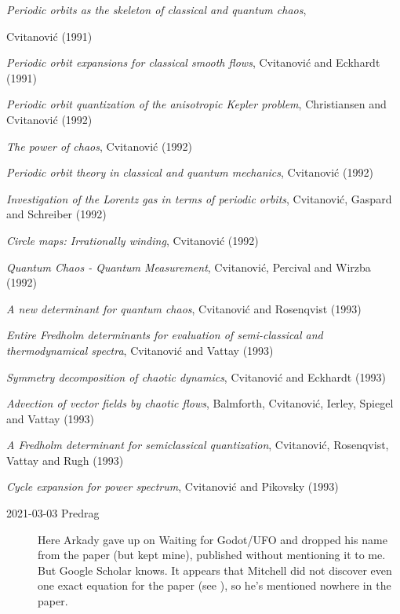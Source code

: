 {\em Periodic orbits as the skeleton of classical and quantum chaos},
{Cvitanovi{\'c}
{(1991)}

{\em Periodic orbit expansions for classical smooth flows},
{Cvitanovi{\'c} and Eckhardt}
{(1991)}

{\em Periodic orbit quantization of the anisotropic {Kepler} problem},
{Christiansen and Cvitanovi{\'c}}
{(1992)}

{\em The power of chaos},
{Cvitanovi{\'c}}
{(1992)}

{\em Periodic orbit theory in classical and quantum mechanics},
{Cvitanovi{\'c}}
{(1992)}

{\em Investigation of the {Lorentz} gas in terms of periodic orbits},
{Cvitanovi{\'c}, Gaspard and Schreiber}
{(1992)}

 {\em Circle maps: {Irrationally} winding},
{Cvitanovi{\'c}}
{(1992)}

{\em {Quantum Chaos - Quantum Measurement}},
{Cvitanovi{\'c}, Percival and Wirzba}
{(1992)}

{\em A new determinant for quantum chaos},
{Cvitanovi{\'c} and Rosenqvist}
{(1993)}

{\em Entire {Fredholm} determinants for evaluation of semi-classical and
thermodynamical spectra},
{Cvitanovi{\'c} and Vattay}
{(1993)}

{\em Symmetry decomposition of chaotic dynamics},
{Cvitanovi{\'c} and Eckhardt}
{(1993)}

{\em Advection of vector fields by chaotic flows},
{Balmforth, Cvitanovi{\'c}, Ierley, Spiegel and Vattay}
{(1993)}

{\em A {Fredholm} determinant for semiclassical quantization},
{Cvitanovi{\'c}, Rosenqvist, Vattay and Rugh}
{(1993)}

{\em Cycle expansion for power spectrum},
{Cvitanovi{\'c} and Pikovsky}
{(1993)}

\begin{description}
  \item[2021-03-03 Predrag]
Here Arkady gave up on Waiting for Godot/UFO and dropped his name from
the paper (but kept mine), published without mentioning it to me. But
Google Scholar knows. It appears that Mitchell did not discover even one
exact equation for the paper
(see ), so he's mentioned nowhere in the paper.
\end{description}

}
